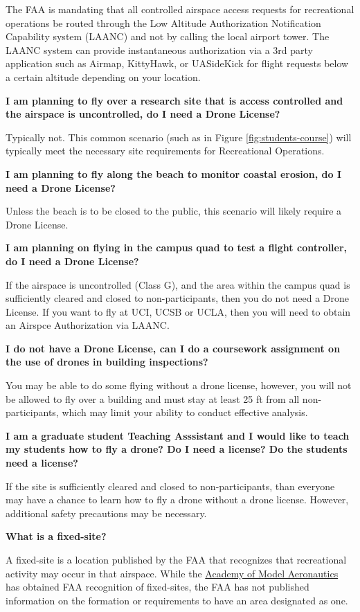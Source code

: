 \documentclass[
]{book}
\begin{document}
The FAA is mandating that all controlled airspace access requests for recreational operations be routed through the Low Altitude Authorization Notification Capability system (LAANC) and not by calling the local airport tower. The LAANC system can provide instantaneous authorization via a 3rd party application such as Airmap, KittyHawk, or UASideKick for flight requests below a certain altitude depending on your location.

\textbf{I am planning to fly over a research site that is access controlled and the airspace is uncontrolled, do I need a Drone License?}

Typically not. This common scenario (such as in Figure \ref{fig:students-course}) will typically meet the necessary site requirements for Recreational Operations.

\textbf{I am planning to fly along the beach to monitor coastal erosion, do I need a Drone License?}

Unless the beach is to be closed to the public, this scenario will likely require a Drone License.

\textbf{I am planning on flying in the campus quad to test a flight controller, do I need a Drone License?}

If the airspace is uncontrolled (Class G), and the area within the campus quad is sufficiently cleared and closed to non-participants, then you do not need a Drone License. If you want to fly at UCI, UCSB or UCLA, then you will need to obtain an Airspce Authorization via LAANC.

\textbf{I do not have a Drone License, can I do a coursework assignment on the use of drones in building inspections?}

You may be able to do some flying without a drone license, however, you will not be allowed to fly over a building and must stay at least 25 ft from all non-participants, which may limit your ability to conduct effective analysis.

\textbf{I am a graduate student Teaching Asssistant and I would like to teach my students how to fly a drone? Do I need a license? Do the students need a license?}

If the site is sufficiently cleared and closed to non-participants, than everyone may have a chance to learn how to fly a drone without a drone license. However, additional safety precautions may be necessary.

\textbf{What is a fixed-site?}

A fixed-site is a location published by the FAA that recognizes that recreational activity may occur in that airspace. While the \protect\hyperlink{AMA}{Academy of Model Aeronautics} has obtained FAA recognition of fixed-sites, the FAA has not published information on the formation or requirements to have an area designated as one.
\end{document}
